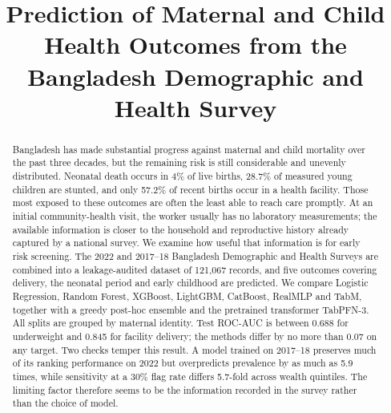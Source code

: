 \documentclass[conference]{IEEEtran}
\begin{document}
\title{Prediction of Maternal and Child Health Outcomes from the Bangladesh
Demographic and Health Survey}

\author{
\and
{}
}

\maketitle

\begin{abstract}
Bangladesh has made substantial progress against maternal and child mortality
over the past three decades, but the remaining risk is still considerable and
unevenly distributed. Neonatal death occurs in 4\% of live births, 28.7\% of
measured young children are stunted, and only 57.2\% of recent births occur in
a health facility. Those most exposed to these outcomes are often the least
able to reach care promptly. At an initial community-health visit, the worker
usually has no laboratory measurements; the available information is closer
to the household and reproductive history already captured by a national
survey. We examine how useful that information is for early risk screening.
The 2022 and 2017--18 Bangladesh Demographic and Health Surveys are combined
into a leakage-audited dataset of 121,067 records, and five outcomes covering
delivery, the neonatal period and early childhood are predicted. We compare
Logistic Regression, Random Forest, XGBoost, LightGBM, CatBoost, RealMLP and
TabM, together with a greedy post-hoc ensemble and the pretrained transformer
TabPFN-3. All splits are grouped by maternal identity. Test ROC-AUC is between
0.688 for underweight and 0.845 for facility delivery; the methods differ by
no more than 0.07 on any target. Two checks temper this result. A model trained
on 2017--18 preserves much of its ranking performance on 2022 but overpredicts
prevalence by as much as 5.9 times, while sensitivity at a 30\% flag rate
differs 5.7-fold across wealth quintiles. The limiting factor therefore seems
to be the information recorded in the survey rather than the choice of model.
\end{abstract}
\end{document}
